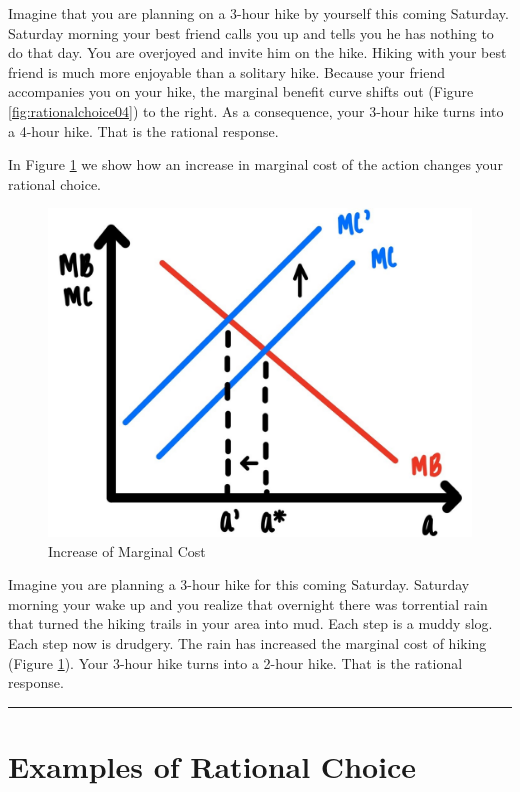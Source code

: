 \documentclass[
]{book}
\begin{document}
Imagine that you are planning on a 3-hour hike by yourself this coming Saturday. Saturday morning your best friend calls you up and tells you he has nothing to do that day. You are overjoyed and invite him on the hike. Hiking with your best friend is much more enjoyable than a solitary hike. Because your friend accompanies you on your hike, the marginal benefit curve shifts out (Figure \ref{fig:rationalchoice04}) to the right. As a consequence, your 3-hour hike turns into a 4-hour hike. That is the rational response.

In Figure \ref{fig:rationalchoice05} we show how an increase in marginal cost of the action changes your rational choice.

\begin{figure}

{\centering \includegraphics[width=0.75\linewidth]{img/rationalchoice/fig5} 

}

\caption{Increase of Marginal Cost}\label{fig:rationalchoice05}
\end{figure}

Imagine you are planning a 3-hour hike for this coming Saturday. Saturday morning your wake up and you realize that overnight there was torrential rain that turned the hiking trails in your area into mud. Each step is a muddy slog. Each step now is drudgery. The rain has increased the marginal cost of hiking (Figure \ref{fig:rationalchoice05}). Your 3-hour hike turns into a 2-hour hike. That is the rational response.

\begin{center}\rule{0.5\linewidth}{0.5pt}\end{center}

\hypertarget{examples-of-rational-choice}{%
\section{Examples of Rational Choice}\label{examples-of-rational-choice}}
\end{document}
